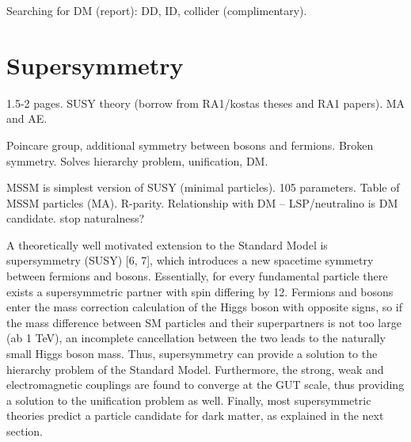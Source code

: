 Searching for DM (report): DD, ID, collider (complimentary). 

\section{Supersymmetry}
\label{sec:theory-susy}
1.5-2 pages. SUSY theory (borrow from RA1/kostas theses and RA1 papers).
MA and AE.

Poincare group, additional symmetry between bosons and fermions.
Broken symmetry.
Solves hierarchy problem, unification, DM.

MSSM is simplest version of SUSY (minimal particles). 105 parameters.
Table of MSSM particles (MA).
R-parity. Relationship with DM – LSP/neutralino is DM candidate.
stop naturalness?

\begin{comment}
MA intro: In its simplest form, supersymmetry doubles the particle spectrum, 
with the new superpartners having a spin difference of half a unit with respect 
to their Stan dard Model counterparts, but sharing all other quantum numbers. 
At the time of writing, no supersymmetric particles have been discovered, which 
implies that the Standard Model particles and their superpartners must have 
different masses, and the symmetry must therefore be broken.
\end{comment}
\begin{comment}
Models of supersymmetry [1, 2] (SUSY) with a stable, neutral, massive, weakly 
interacting, lightest supersymmetric particle (LSP) have received considerable 
attention in recent years [3] because they simultaneously offer a solution to 
the hierarchy problem, allow unification of the fundamental interactions, and 
provide a dark matter candidate
arXiv:1411.7255
\end{comment}

A theoretically well motivated extension to the Standard Model is supersymmetry
(SUSY) [6, 7], which introduces a new spacetime symmetry between fermions and 
bosons. Essentially, for every fundamental particle there exists a 
supersymmetric partner with spin differing by 12. Fermions and bosons enter the 
mass correction calculation of the Higgs boson with opposite signs, so if the 
mass difference between SM particles and their superpartners is not too large 
(ab 1 TeV), an incomplete cancellation between the two leads to the naturally 
small Higgs boson mass. Thus, supersymmetry can provide a solution to the 
hierarchy problem of the Standard Model. Furthermore, the strong, weak and 
electromagnetic couplings are found to converge at the GUT scale, thus providing
a solution to the unification problem as well. Finally, most supersymmetric 
theories predict a particle candidate for dark matter, as explained in the next 
section.


